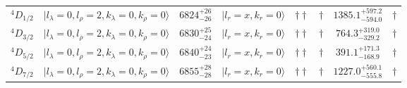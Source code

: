 \begin{tabular}{c| c c c c c c c}
$^{4}D_{1/2}$ & $\vert l_{\lambda}\!\!=\!0, l_{\rho}\!\!=\!2, k_{\lambda}\!\!=\!0, k_{\rho}\!\!=\!0 \rangle$ & $6824^{+26}_{-26}$ & $\vert l_r\!\!=\!x, k_r\!\!=\!0 \rangle$ & $\dagger\dagger$ & $\dagger$ & $1385.1^{+597.2}_{-594.0}$ & $\dagger$ \\ 
$^{4}D_{3/2}$ & $\vert l_{\lambda}\!\!=\!0, l_{\rho}\!\!=\!2, k_{\lambda}\!\!=\!0, k_{\rho}\!\!=\!0 \rangle$ & $6830^{+25}_{-24}$ & $\vert l_r\!\!=\!x, k_r\!\!=\!0 \rangle$ & $\dagger\dagger$ & $\dagger$ & $764.3^{+319.0}_{-329.2}$ & $\dagger$ \\ 
$^{4}D_{5/2}$ & $\vert l_{\lambda}\!\!=\!0, l_{\rho}\!\!=\!2, k_{\lambda}\!\!=\!0, k_{\rho}\!\!=\!0 \rangle$ & $6840^{+24}_{-23}$ & $\vert l_r\!\!=\!x, k_r\!\!=\!0 \rangle$ & $\dagger\dagger$ & $\dagger$ & $391.1^{+171.3}_{-168.9}$ & $\dagger$ \\ 
$^{4}D_{7/2}$ & $\vert l_{\lambda}\!\!=\!0, l_{\rho}\!\!=\!2, k_{\lambda}\!\!=\!0, k_{\rho}\!\!=\!0 \rangle$ & $6855^{+28}_{-28}$ & $\vert l_r\!\!=\!x, k_r\!\!=\!0 \rangle$ & $\dagger\dagger$ & $\dagger$ & $1227.0^{+560.1}_{-555.8}$ & $\dagger$ \\ 
\hline \hline
\end{tabular}
